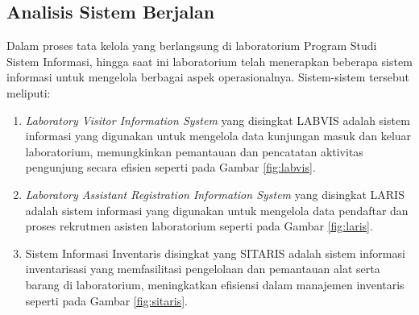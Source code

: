 \subsection{Analisis Sistem Berjalan}
Dalam proses tata kelola yang berlangsung di laboratorium Program Studi Sistem Informasi, hingga saat ini laboratorium telah menerapkan beberapa sistem informasi untuk mengelola berbagai aspek operasionalnya. Sistem-sistem tersebut meliputi:

\begin{enumerate}
	\item \textit{Laboratory Visitor Information System} yang disingkat LABVIS adalah sistem informasi yang digunakan untuk mengelola data kunjungan masuk dan keluar laboratorium, memungkinkan pemantauan dan pencatatan aktivitas pengunjung secara efisien seperti pada Gambar \ref{fig:labvis}.

	\item \textit{Laboratory Assistant Registration Information System} yang disingkat LARIS adalah sistem informasi yang digunakan untuk mengelola data pendaftar dan proses rekrutmen asisten laboratorium seperti pada Gambar \ref{fig:laris}.

	\item Sistem Informasi Inventaris disingkat yang SITARIS adalah sistem informasi inventarisasi yang memfasilitasi pengelolaan dan pemantauan alat serta barang di laboratorium, meningkatkan efisiensi dalam manajemen inventaris seperti pada Gambar \ref{fig:sitaris}.
\end{enumerate}

